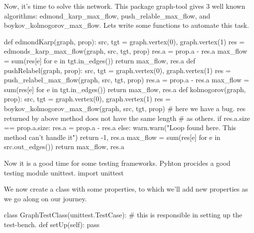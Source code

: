 \documentclass[10pt,a4paper]{article}%
\begin{document}
\nwendcode{}Now, it's time to solve this network. This package {\Tt{}graph-tool\nwendquote} gives 3 well
known algorithms: {\Tt{}edmond{\_}karp{\_}max{\_}flow\nwendquote}, {\Tt{}push{\_}relable{\_}max{\_}flow\nwendquote}, and
{\Tt{}boykov{\_}kolmogorov{\_}max{\_}flow\nwendquote}. Lets write some functions to automate this task.

\nwenddocs{}\plusendmoddef\nwstartdeflinemarkup\nwenddeflinemarkup
def edmondKarp(graph, prop):
    src, tgt = graph.vertex(0), graph.vertex(1)
    res = edmonds_karp_max_flow(graph, src, tgt, prop)
    res.a = prop.a - res.a
    max_flow = sum(res[e] for e in tgt.in_edges())
    return max_flow, res.a
\eatline
\nwendcode{}\nwdocspar
\nwenddocs{}\plusendmoddef\nwstartdeflinemarkup\nwenddeflinemarkup
def pushRelabel(graph, prop):
    src, tgt = graph.vertex(0), graph.vertex(1)
    res = push_relabel_max_flow(graph, src, tgt, prop)
    res.a = prop.a - res.a
    max_flow = sum(res[e] for e in tgt.in_edges())
    return max_flow, res.a
\eatline
\nwendcode{}\nwdocspar
\nwenddocs{}\plusendmoddef\nwstartdeflinemarkup\nwenddeflinemarkup
def kolmogorov(graph, prop):
    src, tgt = graph.vertex(0), graph.vertex(1)
    res = boykov_kolmogorov_max_flow(graph, src, tgt, prop)
    # here we have a bug. res returned by above method does not have the same length
    # as others.
    if res.a.size == prop.a.size:
         res.a = prop.a - res.a
    else:
        warn.warn("Loop found here. This method can't handle it")
        return -1, res.a
    max_flow = sum(res[e] for e in src.out_edges())
    return max_flow, res.a
\nwendcode{}\nwdocspar

\nwenddocs{}\endmoddef\nwstartdeflinemarkup\nwenddeflinemarkup

\nwendcode{}Now it is a good time for some testing frameworks. Pyhton procides a
good testing module {\Tt{}unittest\nwendquote}.
\nwenddocs{}\plusendmoddef\nwstartdeflinemarkup\nwenddeflinemarkup
import unittest

\nwendcode{}We now create a class with some properties, to which we'll add new
properties as we go along on our journey.

\nwenddocs{}\endmoddef\nwstartdeflinemarkup\nwenddeflinemarkup
class GraphTestClass(unittest.TestCase):  
    # this is responsible in setting up the test-bench.
    def setUp(self): pass
\end{document}
